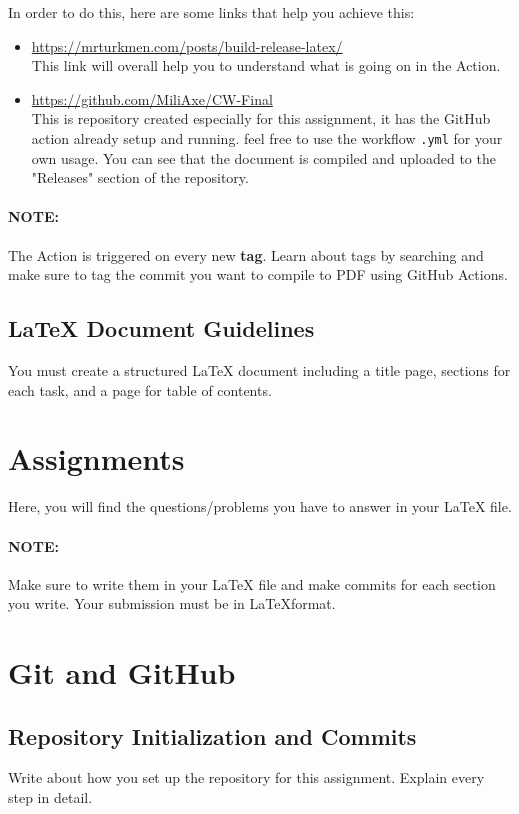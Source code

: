 \documentclass[12pt]{article}
\begin{document}
In order to do this, here are some links that help you achieve this:
\begin{itemize}
    \item \url{https://mrturkmen.com/posts/build-release-latex/} \\
        This link will overall help you to understand what is going on in the Action.
    \item \url{https://github.com/MiliAxe/CW-Final} \\
        This is repository created especially for this assignment, it has the GitHub action already setup and running. feel free to use the workflow \texttt{.yml}
        for your own usage. You can see that the document is compiled and uploaded to the "Releases" section of the repository.
\end{itemize}

\paragraph{NOTE:} The Action is triggered on every new \textbf{tag}. Learn about tags by searching and make sure to tag the commit you want to compile to PDF using
GitHub Actions.

\subsection*{LaTeX Document Guidelines}
You must create a structured LaTeX document including a title page, sections for each task, and a page for table of contents.


\pagebreak


\section*{Assignments}
Here, you will find the questions/problems you have to answer in your LaTeX file.
\paragraph{NOTE:} Make sure to write them in your LaTeX file and make commits for each section you write. Your submission must be in \LaTeX format.

\section{Git and GitHub}
\subsection{Repository Initialization and Commits}
Write about how you set up the repository for this assignment. Explain every step in detail.
\end{document}
